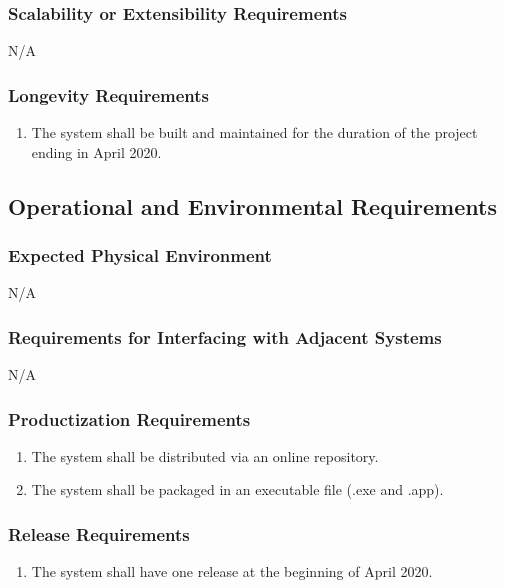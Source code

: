 \documentclass[]{article}
\begin{document}
\subsubsection{Scalability or Extensibility Requirements}
\label{ssub:scalability_or_extensibility_requirements}
N/A

\subsubsection{Longevity Requirements}
\label{ssub:longevity_requirements}
\begin{enumerate}[start=7, label={PR\arabic*.}]
    \item The system shall be built and maintained for the duration of the 
    project ending in April 2020.
\end{enumerate}

\subsection{Operational and Environmental Requirements}
\label{sub:operational_and_environmental_requirements}

\subsubsection{Expected Physical Environment}
\label{ssub:expected_physical_environment}
N/A

\subsubsection{Requirements for Interfacing with Adjacent Systems}
\label{ssub:requirements_for_interfacing_with_adjacent_systems}
N/A

\subsubsection{Productization Requirements}
\label{ssub:productization_requirements}
\begin{enumerate}[start=1, label={OE\arabic*.}]
    \item The system shall be distributed via an online repository. 
    \item The system shall be packaged in an executable file (.exe and .app).
\end{enumerate}

\subsubsection{Release Requirements}
\label{ssub:release_requirements}
\begin{enumerate}[start=3, label={OE\arabic*.}]
    \item The system shall have one release at the beginning of April 2020.
\end{enumerate}
\end{document}
